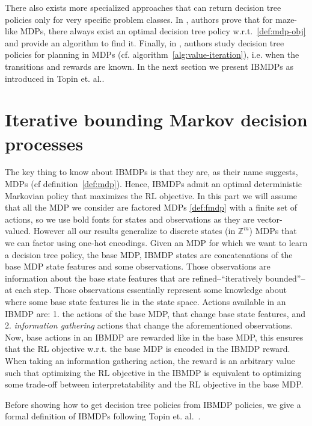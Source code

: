 There also exists more specialized approaches that can return decision tree policies only for very specific problem classes.
In \cite{dt-maze}, authors prove that for maze-like MDPs, there always exist an optimal decision tree policy w.r.t.~\ref{def:mdp-obj} and provide an algorithm to find it. 
Finally, in \cite{dt-opt-mdp}, authors study decision tree policies for planning in MDPs (cf. algorithm~\ref{alg:value-iteration}), i.e. when the transitions and rewards are known.
In the next section we present IBMDPs as introduced in Topin et. al.\cite{topin2021iterative}.

\section{Iterative bounding Markov decision processes}\label{sec:ibmdp}

The key thing to know about IBMDPs is that they are, as their name suggests, MDPs (cf definition~\ref{def:mdp}).
Hence, IBMDPs admit an optimal deterministic Markovian policy that maximizes the RL objective.
In this part we will assume that all the MDP we consider are factored MDPs \ref{def:fmdp} with a finite set of actions, so we use bold fonts for states and observations as they are vector-valued.
However all our results generalize to discrete states (in $\mathbb{Z}^m$) MDPs that we can factor using one-hot encodings. 
Given an MDP for which we want to learn a decision tree policy, the base MDP, IBMDP states are concatenations of the base MDP state features and some observations. 
Those observations are information about the base state features that are refined--``iteratively bounded''-- at each step.
Those observations essentially represent some knowledge about where some base state features lie in the state space.
Actions available in an IBMDP are: 1. the actions of the base MDP, that change base state features, and 2. \textit{information gathering} actions that change the aforementioned observations.
Now, base actions in an IBMDP are rewarded like in the base MDP, this ensures that the RL objective w.r.t. the base MDP is encoded in the IBMDP reward.
When taking an information gathering action, the reward is an arbitrary value such that optimizing the RL objective in the IBMDP is equivalent to optimizing some trade-off between interpretatability and the RL objective in the base MDP.
 
Before showing how to get decision tree policies from IBMDP policies, we give a formal definition of IBMDPs following Topin et. al.~\cite{topin2021iterative}.

